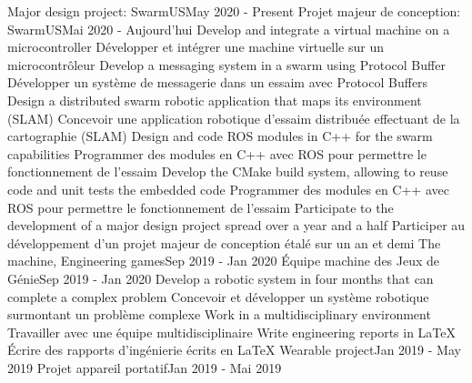    \resumeSubHeadingListStart
      \resumeProjectHeadingEnFr
          {Major design project: SwarmUS}{May 2020 - Present}
          {Projet majeur de conception: SwarmUS}{Mai 2020 - Aujourd’hui}
            \resumeItemListStart
                \resumeItemEnFr
                    {Develop and integrate a virtual machine on a microcontroller}
                    {Développer et intégrer une machine virtuelle sur un microcontrôleur}
                \resumeItemEnFr
                    {Develop a messaging system in a swarm using Protocol Buffer}
                    {Développer un système de messagerie dans un essaim avec Protocol Buffers}
                \resumeItemEnFr
                    {Design a distributed swarm robotic application that maps its environment (SLAM)}
                    {Concevoir une application robotique d’essaim distribuée effectuant de la cartographie (SLAM)}
                \resumeItemEnFr
                    {Design and code ROS modules in C++ for the swarm capabilities}
                    {Programmer des modules en C++ avec ROS pour permettre le fonctionnement de l’essaim}
                \resumeItemEnFr
                    {Develop the CMake build system, allowing to reuse code and unit tests the embedded code}
                    {Programmer des modules en C++ avec ROS pour permettre le fonctionnement de l’essaim}
                \resumeItemEnFr
                    {Participate to the development of a major design project spread over a year and a half}
                    {Participer au développement d’un projet majeur de conception étalé sur un an et demi}
            \resumeItemListEnd
      \resumeProjectHeadingEnFr
          {The machine, Engineering games}{Sep 2019 - Jan 2020}
          {Équipe machine des Jeux de Génie}{Sep 2019 - Jan 2020}
            \resumeItemListStart
                \resumeItemEnFr
                    {Develop a robotic system in four months that can complete a complex problem}
                    {Concevoir et développer un système robotique surmontant un problème complexe}
                \resumeItemEnFr
                    {Work in a multidisciplinary environment}
                    {Travailler avec une équipe multidisciplinaire}
                \resumeItemEnFr
                    {Write engineering reports in LaTeX}
                    {Écrire des rapports d’ingénierie écrits en LaTeX}
            \resumeItemListEnd
      \resumeProjectHeadingEnFr
          {Wearable project}{Jan 2019 - May 2019}
          {Projet appareil portatif}{Jan 2019 - Mai 2019}
